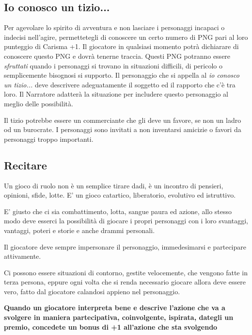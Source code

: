 \begin{multicols}{2}
\subsection{Io conosco un tizio...}\label{ioconoscountizio}\hypertarget{ioconoscountizio}{}

Per agevolare lo spirito di avventura e non lasciare i personaggi incapaci o indecisi nell'agire, permettetegli di conoscere un certo numero di PNG pari al loro punteggio di Carisma +1. Il giocatore in qualsiasi momento potrà dichiarare di conoscere questo PNG e dovrà tenerne traccia. Questi PNG potranno essere \emph{sfruttati} quando i personaggi si trovano in situazioni difficili, di pericolo o semplicemente bisognosi si supporto. Il personaggio che si appella al \emph{io conosco un tizio...} deve descrivere adeguatamente il soggetto ed il rapporto che c'è tra loro. Il Narratore adatterà la situazione per includere questo personaggio al meglio delle possibilità.

Il tizio potrebbe essere un commerciante che gli deve un favore, se non un ladro od un burocrate. I personaggi sono invitati a non inventarsi amicizie o favori da personaggi troppo importanti.

\subsection{Recitare}\label{ruolare}

\label{recitare}

Un gioco di ruolo non è un semplice tirare dadi, è un incontro di pensieri, opinioni, sfide, lotte. E' un gioco catartico, liberatorio, evolutivo ed istruttivo.

E' giusto che ci sia combattimento, lotta, sangue paura ed azione, allo stesso modo deve esserci la possibilità di giocare i propri personaggi con i loro svantaggi, vantaggi, poteri e storie e anche drammi personali.

Il giocatore deve sempre impersonare il personaggio, immedesimarsi e partecipare attivamente.

Ci possono essere situazioni di contorno, gestite velocemente, che vengono fatte in terza persona, eppure ogni volta che si renda necessario giocare allora deve essere vero, fatto dal giocatore calandosi appieno nel personaggio.

\medskip

\textbf{Quando un giocatore interpreta bene e descrive l'azione che va a svolgere in maniera \textbf{partecipativa}, \textbf{coinvolgente}, \textbf{ispirata}, dategli un premio, concedete un bonus di +1 all'azione che sta svolgendo}


\end{multicols}
